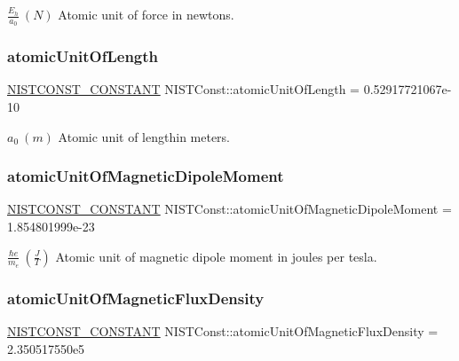 $\frac{E_h}{a_0} \ (N)$ Atomic unit of force in newtons. \mbox{\label{group___n_i_s_t_const-_atomic_unit_ga2611c2902279953d3d6a18cfd1dfce3e}} 
\subsubsection{\texorpdfstring{atomic\+Unit\+Of\+Length}{atomicUnitOfLength}}
{\footnotesize\ttfamily \mbox{\hyperlink{group___n_i_s_t_const-_macros_ga2b0fc1d7452373f816175dd86ce26729}{N\+I\+S\+T\+C\+O\+N\+S\+T\+\_\+\+C\+O\+N\+S\+T\+A\+NT}} N\+I\+S\+T\+Const\+::atomic\+Unit\+Of\+Length = 0.\+52917721067e-\/10}

$a_0 \ (m)$ Atomic unit of lengthin meters. \mbox{\label{group___n_i_s_t_const-_atomic_unit_gacc6b0608f4456d2fb880dc295b852433}} 
\subsubsection{\texorpdfstring{atomic\+Unit\+Of\+Magnetic\+Dipole\+Moment}{atomicUnitOfMagneticDipoleMoment}}
{\footnotesize\ttfamily \mbox{\hyperlink{group___n_i_s_t_const-_macros_ga2b0fc1d7452373f816175dd86ce26729}{N\+I\+S\+T\+C\+O\+N\+S\+T\+\_\+\+C\+O\+N\+S\+T\+A\+NT}} N\+I\+S\+T\+Const\+::atomic\+Unit\+Of\+Magnetic\+Dipole\+Moment = 1.\+854801999e-\/23}

$\frac{\hbar e}{m_e} \ (\frac{J}{T})$ Atomic unit of magnetic dipole moment in joules per tesla. \mbox{\label{group___n_i_s_t_const-_atomic_unit_gafc19eaca8ac811b061e8630bd3203930}} 
\subsubsection{\texorpdfstring{atomic\+Unit\+Of\+Magnetic\+Flux\+Density}{atomicUnitOfMagneticFluxDensity}}
{\footnotesize\ttfamily \mbox{\hyperlink{group___n_i_s_t_const-_macros_ga2b0fc1d7452373f816175dd86ce26729}{N\+I\+S\+T\+C\+O\+N\+S\+T\+\_\+\+C\+O\+N\+S\+T\+A\+NT}} N\+I\+S\+T\+Const\+::atomic\+Unit\+Of\+Magnetic\+Flux\+Density = 2.\+350517550e5}

